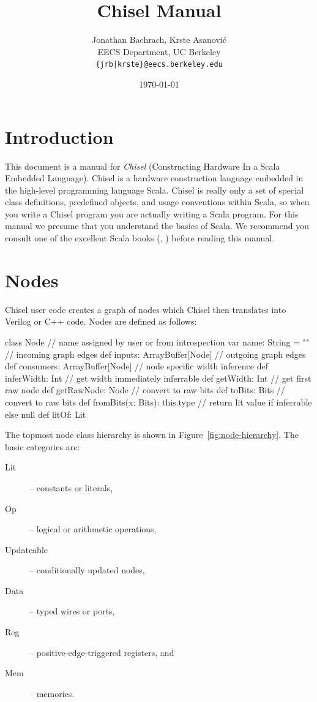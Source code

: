 \documentclass[10pt,twocolumn]{article}
\title{Chisel Manual}
\author{Jonathan Bachrach, Krste Asanovi\'{c} \\
EECS Department, UC Berkeley\\
{\tt  \{jrb|krste\}@eecs.berkeley.edu}
}
\date{\today}
\begin{document}
\maketitle{}




\section{Introduction}

This document is a manual for {\em Chisel} (Constructing
Hardware In a Scala Embedded Language).  Chisel is a hardware
construction language embedded in the high-level programming language
Scala.  Chisel is really only a set of special class
definitions, predefined objects, and usage conventions within Scala,
so when you write a Chisel program you are actually writing a Scala
program.  For this manual we presume that you
understand the basics of Scala.  
We recommend you consult one of the excellent
Scala books (\cite{programming-scala}, \cite{programming-in-scala}) before reading this manual.

\section{Nodes}

Chisel user code creates a graph of nodes which Chisel then translates
into Verilog or C++ code.  Nodes are defined as follows:

\begin{scala}
class Node {
  // name assigned by user or from introspection
  var name: String = ""
  // incoming graph edges
  def inputs: ArrayBuffer[Node]
  // outgoing graph edges
  def consumers: ArrayBuffer[Node]
  // node specific width inference
  def inferWidth: Int
  // get width immediately inferrable
  def getWidth: Int
  // get first raw node
  def getRawNode: Node
  // convert to raw bits 
  def toBits: Bits
  // convert to raw bits 
  def fromBits(x: Bits): this.type
  // return lit value if inferrable else null
  def litOf: Lit
}
\end{scala}


The topmost node class hierarchy is shown in
Figure~\ref{fig:node-hierarchy}.  The basic categories are:

\begin{description}
\item[Lit] -- constants or literals,
\item[Op] -- logical or arithmetic operations,
\item[Updateable] -- conditionally updated nodes,
\item[Data] -- typed wires or ports,
\item[Reg] -- positive-edge-triggered registers, and
\item[Mem] -- memories.
\end{description}
\end{document}
